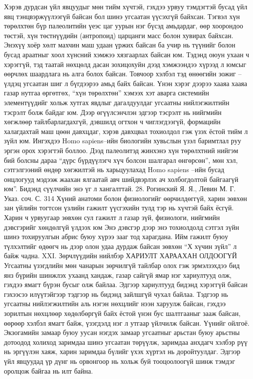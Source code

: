 Хэрэв дурдсан үйл явцуудыг мөн тийм хүчтэй, гэхдээ урвуу тэмдэгтэй бусад үйл явц тэнцвэржүүлээгүй байсан бол шинэ угсаатан үүсэхгүй байхсан. Тэгвэл хүн төрөлхтөн бүр палеолитийн үеэс цаг уурын нэг бүсэд амьдардаг, өөр хоорондоо төстэй, хүн төстнүүдийн (антропоид) царцанги масс болон хувирах байхсан. Энэхүү хоёр хөлт махчин маш удаан үржих байсан ба учир нь түүнийг болон бусад араатныг хоол хүнсний хэмжээ хязгаарлах байсан юм. Тэдэнд оюун ухаан ч хэрэггүй, тэд таатай нөхцөлд дасан зохицохуйн дээд хэмжээндээ хүрээд л юмсыг өөрчлөх шаардлага нь алга болох байсан. Товчоор хэлбэл тэд өнөөгийн зожиг – үлдэц угсаатан шиг л бүгдээрээ амьд байх байсан.
Үнэн хэрэг дээрээ хааяа хааяа газар нутгаа өргөтгөх, “хүн төрөлхтөн” хэмээх хэт аварга системийн элементүүдийг хольж хутгах явдлыг дагалдуулдаг угсаатны нийлэгжилтийн тэсрэлт болж байдаг юм. Дээр өгүүлсэнчлэн эдгээр тэсрэлт нь нийгмийн хөгжлөөр тайлбарлагдахгүй, дэвшилд огтхон ч чиглэгдээгүй, формацийн халагдахтай маш цөөн давхцдаг, хэрэв давхцвал тохиолдол гэж үзэх ёстой тийм л зүйл юм. Ингэхдээ Homo sapiens–ийн биологийн хувьслын үзэл баримтлал руу эргэн орох хэрэгтэй боллоо. Дээд палеолитэд жинхэнэ хүн төрөлхтний нийгэм бий болсны дараа “дүрс бүрдүүлэгч хүч болсон шалгарал өнгөрсөн”, мөн хэл, сэтгэлгээний өндөр хөгжилтэй нь харьцуулахад Homo sapiens –ийн бусад онцлогууд мэдээж жаахан ялгаатай авч шийдвэрлэх ач холбогдолтой байгаагүй юм”. Бидэнд сүүлчийн энэ үг л хангалттай. 28. Рогинский Я. Я., Левин М. Г. Указ. соч. С. 314
Хүний анатоми болон физиологийг өөрчилдөггүй, харин зөвхөн зан үйлийн тогтсон үзлийн гажилт үүсгэхийн тулд тэр нь хүчтэй байх ёсгүй. Харин ч урвуугаар зөвхөн сул гажилт л газар зүй, физиологи, нийгмийн дэвсгэрийг хөндөлгүй үлдээх юм Энэ дэвсгэр дээр энэ тохиолдолд сэтгэл зүйн шинэ тохируулгын абрис буюу хүрээ зааг тод харагдана. Ийм гажилт буюу түлхэлтийг өдөөгч нь дээр олон удаа дурдаж байсан зөвхөн “Х хүчин зүйл” л байж чадна.
XXI. Зөрчлүүдийн нийлбэр
ХАРИУЛТ ХАРААХАН ОЛДООГҮЙ
Угсаатны үзэгдлийн мөн чанарын зөрчилгүй тайлбар олох гэж эрмэлзэхдээ бид янз бүрийн шинжлэх ухаанд хандаж, газар сайгүй ямар нэг хариултууд олж, гэхдээ ямагт бүрэн бусыг олж байлаа. Эдгээр хариултууд бидэнд хэрэггүй байсан гэхээсээ илүүтэйгээр тэдгээр нь бидэнд зайлшгүй чухал байлаа. Тэдгээр нь угсаатны нийлэгжилтийн аль нэгэн нөхцлийг нээн харуулж байсан, гэхдээ зорилтын нөхцлөөр хөдөлбөргүй байх ёстой үнэн бус шалтгааныг зааж байсан, өөрөөр хэлбэл ямагт байж, үзэгдэлд нэг л утгаар үйлчилж байсан. Үүнийг ойлгоё.
Экзогамийн замаар буюу уусан нэгдэх замаар угсаатныг арьстан буюу арьстны дотоодод холиход заримдаа шинэ угсаатан төрүүлж, заримдаа анхдагч хэлбэр рүү нь эргүүлэн хаяж, харин заримдаа бүлийг үхэх хүртэл нь доройтуулдаг. Эдгээр үйл явцуудад үр дүнг нь орвонгоор нь хольж буй тооцоолоогүй шинж тэмдэг оролцож байгаа нь илт байна.
